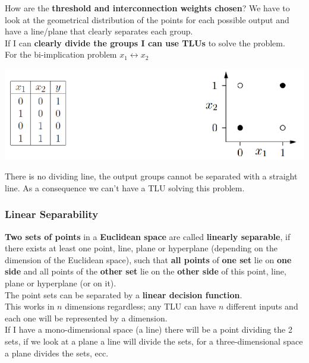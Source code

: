 \documentclass[11pt]{article}
\begin{document}
		\newpage
		
		How are the \textbf{threshold and interconnection weights chosen}? We have to look at the geometrical distribution of the points for each possible output and have a line/plane that clearly separates each group.\\
		
		If I can \textbf{clearly divide the groups I can use TLUs} to solve the problem.\\
		
		For the bi-implication problem $x_1 \leftrightarrow x_2$
		\begin{center}
			\includegraphics[width=0.9\columnwidth]{img/NN/TLU7}
		\end{center}
		There is no dividing line, the output groups cannot be separated with a straight line. As a consequence we can't have a TLU solving this problem.\\
		
		\newpage
		
		\subsubsection{Linear Separability}
		\textbf{Two sets of points} in a \textbf{Euclidean space} are called \textbf{linearly separable}, if there exists at least one point, line, plane or hyperplane (depending on the dimension of the Euclidean space), such that \textbf{all points} of \textbf{one set} lie on \textbf{one side} and all points of the \textbf{other set} lie on the \textbf{other side} of this point, line, plane or hyperplane (or on it).\\
		
		The point sets can be separated by a \textbf{linear decision function}.\\
		
		This works in $n$ dimensions regardless; any TLU can have $n$ different inputs and each one will be represented by a dimension.\\
		
		If I have a mono-dimensional space (a line) there will be a point dividing the 2 sets, if we look at a plane a line will divide the sets, for a three-dimensional space a plane divides the sets, ecc.\\
		
\end{document}
